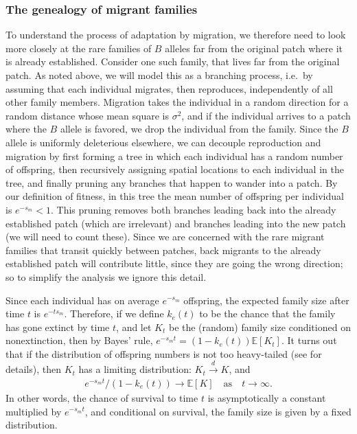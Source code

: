 \documentclass{article}
\newcommand{\citet}[1]{\cite{#1}}
\newcommand{\E}{\mathbb{E}}
\newcommand{\dconv}{\xrightarrow{d}}
\begin{document}
\subsubsection{The genealogy of migrant families}
\label{ss:migrant_math}

To understand the process of adaptation by migration,
we therefore need to look more closely at the rare families of $B$ alleles 
far from the original patch where it is already established.
Consider one such family,
that lives far from the original patch.
As noted above, we will model this as a branching process,
i.e.\ by assuming that each individual
migrates, then reproduces, independently of all other family members.
Migration takes the individual in a random direction
for a random distance whose mean square is $\sigma^2$,
and if the individual arrives to a patch where the $B$ allele is favored, 
we drop the individual from the family.
Since the $B$ allele is uniformly deleterious elsewhere,
we can decouple reproduction and migration
by first forming a tree in which each individual has a random number of offspring,
then recursively assigning spatial locations to each individual in the tree,
and finally pruning any branches that happen to wander into a patch.
By our definition of fitness, 
in this tree the mean number of offspring per individual is $e^{-s_m} < 1$.
This pruning removes both branches leading back into the already established patch (which are irrelevant)
and branches leading into the new patch (we will need to count these).
Since we are concerned with the rare migrant families that transit quickly between patches, 
back migrants to the already established patch will contribute little, since they are going the wrong direction;
so to simplify the analysis we ignore this detail.  %

Since each individual has on average $e^{-s_m}$ offspring,
the expected family size after time $t$ is $e^{- t s_m}$.
Therefore, if we define $k_e(t)$ to be the chance that the family
has gone extinct by time $t$, 
and let $K_t$ be the (random) family size conditioned on nonextinction,
then by Bayes' rule, $e^{-s_m t} = (1-k_e(t))\E[K_t]$.
It turns out that if the distribution of offspring numbers is not too heavy-tailed 
(see \citet{jagers1975branching} for details),
then $K_t$ has a limiting distribution: $K_t \dconv K$,
and 
\begin{align} \label{eqn:EK_limit}
    e^{-s_m t}/(1-k_e(t)) \to \E[K] \quad \text{as} \quad t \to \infty .
\end{align}
In other words, the chance of survival to time $t$ is asymptotically a constant multiplied by $e^{-s_m t}$,
and conditional on survival, the family size is given by a fixed distribution.
\end{document}
